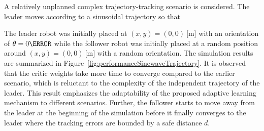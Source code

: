 \documentclass[conference]{IEEEtran}
\begin{document}
 


 A relatively unplanned complex trajectory-tracking scenario is considered. The leader moves according to a sinusoidal trajectory so that %
 
% 
 The leader robot  was initially placed at $(x,y) = (0, 0)~\si{[\meter]}$ with an orientation of $\theta = 0 \degree$ while the follower robot was initially placed at a random position around $(x,y) = (0, 0)~\si{[\meter]}$ with a random orientation. The simulation results are summarized in Figure~\ref{fig:performanceSinewaveTrajectory}. It is observed that the critic weights take more time to converge compared to the earlier scenario,  which is reluctant to the complexity of the independent trajectory of the leader. This result emphasizes the adaptability of the proposed adaptive learning mechanism to different scenarios. Further, the follower starts to move away from the leader at the beginning of the simulation before it finally converges to the leader where the tracking errors are bounded by a safe distance $d.$ %
 
\end{document}
